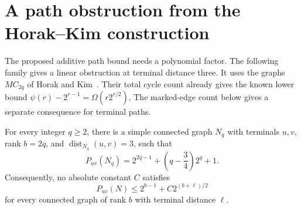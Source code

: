 \section{A path obstruction from the Horak--Kim construction}
\label{sec:second-order-constructions}

The proposed additive path bound needs a polynomial factor.
The following family gives a linear obstruction at terminal distance three.
It uses the graphs $MC_{2q}$ of Horak and Kim~\cite{HK}.
Their total cycle count already gives the known lower bound
$\psi(r)-2^{r-1}=\Omega(r2^{r/2})$.
The marked-edge count below gives a separate consequence for terminal paths.

\begin{proposition}\label{prop:hk-short-path-obstruction}
For every integer $q\ge2$, there is a simple connected graph $N_q$
with terminals $u,v$, rank $b=2q$, and $\operatorname{dist}_{N_q}(u,v)=3$,
such that
\[
 P_{uv}(N_q)=2^{2q-1}+\left(q-\frac34\right)2^q+1.
\]
Consequently, no absolute constant $C$ satisfies
\[
 P_{uv}(N)\le 2^{b-1}+C2^{(b+\ell)/2}
\]
for every connected graph of rank $b$ with terminal distance $\ell$.
\end{proposition}

